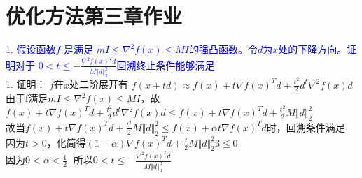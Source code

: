 \documentclass{article}
\begin{document}
{\centering\section*{优化方法第三章作业}}
\textcolor{blue}{1. 假设函数$f$ 是满足 $ mI \leq \nabla^2 f(x) \leq MI$的强凸函数。令$d$为$x$处的下降方向。证明对于 
$0<t \leq -\frac{\nabla^2 f(x)^Td}{M\Vert d \Vert_2^2}$回溯终止条件能够满足}\\
1. 证明：
$f$在$x$处二阶展开有 $f(x+td) \approx f(x) + t \nabla f(x)^T d + \frac{t^2}{2}d^t\nabla^2 f(x)d$\\
由于f满足$ mI \leq \nabla^2 f(x) \leq MI$，故\\
$f(x) + t \nabla f(x)^T d + \frac{t^2}{2}d^t\nabla^2 f(x)d \leq f(x) + t \nabla f(x)^T d + \frac{t^2}{2}M\Vert d \Vert_2^2$\\
故当$f(x) + t \nabla f(x)^T d + \frac{t^2}{2}M\Vert d \Vert_2^2 \leq f(x) + \alpha t \nabla f(x)^T d$时，回溯条件满足\\
因为$t > 0$，化简得$(1-\alpha)\nabla f(x)^T d  +  \frac{t}{2}M\Vert d \Vert_2^2ß \leq 0$\\
因为$0 < \alpha < \frac{1}{2}$, 所以$ 0 < t \leq -\frac{\nabla^2 f(x)^Td}{M\Vert d \Vert_2^2}$\\
\end{document}
